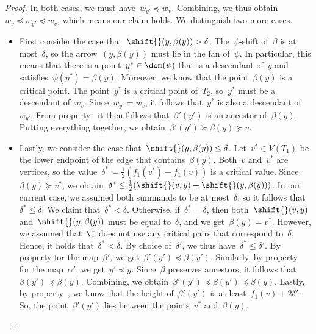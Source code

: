\begin{proof}
    In both cases, we must have~$w_{y'} \preceq w_v$.
    Combining, we thus obtain~$w_v \preceq w_{y'} \preceq w_v$, which means our claim holds.
    We distinguish two more cases.
%
	\begin{itemize}
		\item 
			First consider the case that~$\shift{}(y, \beta(y)) > \delta$.
            The~$\psi$-shift of~$\beta$ is at most~$\delta$, so the arrow~$(y, \beta(y))$ must lie in the fan of~$\psi$.
            In particular, this means that there is a point~$y^* \in \dom(\psi)$ that is a descendant of~$y$ and satisfies~$\psi(y^*) = \beta(y)$.
            Moreover, we know that the point~$\beta(y)$ is a critical point.
            The point~$y^*$ is a critical point of~$T_2$, so~$y^*$ must be a descendant of~$w_v$.
            Since~$w_{y'} = w_v$, it follows that~$y^*$ is also a descendant of~$w_{y'}$.
            From property~ it then follows that~$\beta'(y')$ is an ancestor of~$\beta(y)$.
            Putting everything together, we obtain~$\beta'(y') \succeq \beta(y) \succeq v$.
		\item
			Lastly, we consider the case that~$\shift{}(y, \beta(y)) \le \delta$.
            Let~$v^* \in V(T_1)$ be the lower endpoint of the edge that contains~$\beta(y)$.
			Both~$v$ and~$v^*$ are vertices, so the value~$\delta^* \coloneqq \tfrac{1}{2}(f_1(v^*) - f_1(v))$ is a critical value.
            Since~$\beta(y) \succeq v^*$, we obtain~$\delta^* \le \tfrac{1}{2}(\shift{}(v, y) + \shift{}(y, \beta(y)))$.
			In our current case, we assumed both summands to be at most~$\delta$, so it follows that~$\delta^* \le \delta$.
            We claim that~$\delta^* < \delta$.
            Otherwise, if~$\delta^* = \delta$, then both~$\shift{}(v, y)$ and~$\shift{}(y, \beta(y))$ must be equal to~$\delta$, and we get~$\beta(y) = v^*$.
            However, we assumed that~$\I$ does not use any critical pairs that correspond to~$\delta$.
            Hence, it holds that~$\delta^* < \delta$.
			By choice of~$\delta'$, we thus have~$\delta^* \le \delta'$.
			By property  for the map~$\beta'$, we get~$\beta'(y') \preceq \beta(y')$.
            Similarly, by property~ for the map~$\alpha'$, we get~$y' \preceq y$.
            Since~$\beta$ preserves ancestors, it follows that~$\beta(y') \preceq \beta(y)$.
            Combining, we obtain~$\beta'(y') \preceq \beta(y') \preceq \beta(y)$.
			Lastly, by property~, we know that the height of~$\beta'(y')$ is at least~$f_1(v) + 2\delta'$.
			So, the point~$\beta'(y')$ lies between the points~$v^*$ and~$\beta(y)$.

\end{itemize}
\end{proof}
